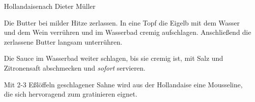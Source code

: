 \begin{recipe}{Hollandaise}{nach Dieter Müller}
  \label{Hollandaise}
  \inglist
  
  \steps
  Die Butter bei milder Hitze zerlassen. In eine Topf die Eigelb mit dem Wasser und dem
  Wein verrühren und im Wasserbad cremig aufschlagen. Anschließend die zerlassene Butter
  langsam unterrühren.

  Die Sauce im Wasserbad weiter schlagen, bis sie cremig ist, mit Salz und Zitronensaft 
  abschmecken und \textit{sofort} servieren.
  
  Mit 2-3 Eßlöffeln geschlagener Sahne wird aus der Hollandaise eine Mousseline, die sich
  hervoragend zum gratinieren eignet.
\end{recipe}
